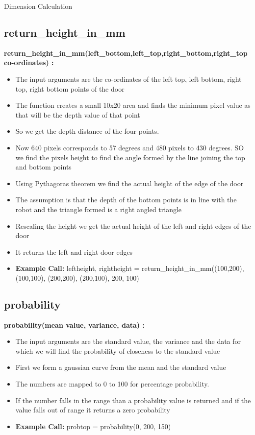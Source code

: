 \documentclass[10pt, a4paper]{beamer}
\begin{document}
\begin{frame}[allowframebreaks]{Dimension Calculation}
    \subsection{return\_height\_in\_mm}
      \textbf{return\_height\_in\_mm(left\_bottom,left\_top,right\_bottom,right\_top co-ordinates) : }
	\begin{itemize}
       \item The input arguments are the co-ordinates of the left top, left bottom, right top, right bottom points of the door
       \item The function creates a small 10x20 area and finds the minimum pixel value as that will be the depth value of that point
       \item So we get the depth distance of the four points.
       \item Now 640 pixels corresponds to 57 degrees and 480 pixels to 430 degrees. SO we find the pixels height to find the angle formed by the line joining the top and bottom points
       \item Using Pythagoras theorem we find the actual height of the edge of the door
       \item The assumption is that the depth of the bottom points is in line with the robot and the triangle formed is a right angled triangle
       \item Rescaling the height we get the actual height of the left and right edges of the door
       \item It returns the left and right door edges
       \item \textbf{Example Call:} leftheight, rightheight = return\_height\_in\_mm((100,200), (100,100), (200,200), (200,100), 200, 100)
	\end{itemize}
  \framebreak
    \subsection{probability}
      \textbf{probability(mean value, variance, data) : }
	\begin{itemize}
	 \item The input arguments are the standard value, the variance and the data for which we will find the probability of closeness to the standard value
	 \item First we form a gaussian curve from the mean and the standard value
	 \item The numbers are mapped to 0 to 100 for percentage probability.
	 \item If the number falls in the range than a probability value is returned and if the value falls out of range it returns a zero probability
	 \item \textbf{Example Call:} probtop = probability(0, 200, 150)
	\end{itemize}
\end{frame}
\end{document}

